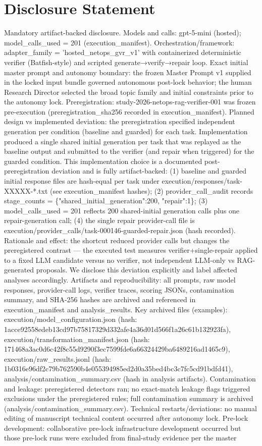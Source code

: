 \documentclass[conference]{IEEEtran}
\begin{document}
\section*{Disclosure Statement}
Mandatory artifact-backed disclosure. Models and calls: gpt-5-mini (hosted); model\_calls\_used = 201 (execution\_manifest). Orchestration/framework: adapter\_family = 'hosted\_netops\_gvr\_v1' with containerized deterministic verifier (Batfish-style) and scripted generate→verify→repair loop. Exact initial master prompt and autonomy boundary: the frozen Master Prompt v1 supplied in the locked input bundle governed autonomous post-lock behavior; the human Research Director selected the broad topic family and initial constraints prior to the autonomy lock. Preregistration: study-2026-netops-rag-verifier-001 was frozen pre-execution (preregistration\_sha256 recorded in execution\_manifest). Planned design vs implemented deviation: the preregistration specified independent generation per condition (baseline and guarded) for each task. Implementation produced a single shared initial generation per task that was replayed as the baseline output and submitted to the verifier (and repair when triggered) for the guarded condition. This implementation choice is a documented post-preregistration deviation and is fully artifact-backed: (1) baseline and guarded initial response files are hash-equal per task under execution/responses/task-XXXXX-*.txt (see execution\_manifest hashes); (2) provider\_call\_audit records stage\_counts = \{"shared\_initial\_generation":200, "repair":1\}; (3) model\_calls\_used = 201 reflects 200 shared-initial generation calls plus one repair-generation call; (4) the single repair provider-call file is execution/provider\_calls/task-000146-guarded-repair.json (hash recorded). Rationale and effect: the shortcut reduced provider calls but changes the preregistered contrast --- the executed test measures verifier+single-repair applied to a fixed LLM candidate versus no verifier, not independent LLM-only vs RAG-generated proposals. We disclose this deviation explicitly and label affected analyses accordingly. Artifacts and reproducibility: all prompts, raw model responses, provider-call logs, verifier traces, scoring JSONs, contamination summary, and SHA-256 hashes are archived and referenced in execution\_manifest and analysis\_results. Key archived files (examples): execution/model\_configuration.json (hash: 1acce92558edeb13cd97b75817329d332afe4a36d01d566f1a26c61b132923fa), execution/transformation\_manifest.json (hash: 171468a3ac0d6c42f8c55d9290f3ec7599fde6a66324429ba6489216ad1465c9), execution/raw\_results.jsonl (hash: 1b0316e96df2c79b762590b4e055394985ed2d0a35bed4bc3c7fc5cd91bdfd41), analysis/contamination\_summary.csv (hash in analysis artifacts). Contamination and leakage: preregistered detectors ran; no exact-match leakage flags triggered exclusions under the preregistered rules; full contamination summary is archived (analysis/contamination\_summary.csv). Technical restarts/deviations: no manual editing of manuscript technical content occurred after autonomy lock. Pre-lock development: collaborative pre-lock infrastructure development occurred but those pre-lock runs were excluded from final-study evidence per the master 
\end{document}
